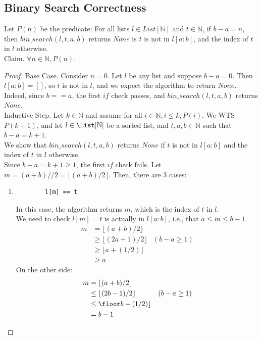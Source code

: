 \documentclass{article}
\begin{document}
\subsection{Binary Search Correctness}
Let $P(n)$ be the predicate: For all lists $l \in List[\mathbb{N}]$ and $t \in \mathbb{N}$, if $b - a = n$, then $bin\_search(l,t,a,b)$ returns $None$ is $t$ is not in $l[a:b]$, and the index of $t$ in $l$ otherwise.\\
Claim. $\forall n \in \mathbb{N}, P(n)$.
\begin{proof}
Base Case. Consider $n = 0$. Let $l$ be any list and suppose $b-a = 0$. Then $l[a:b] = []$, so $t$ is not in $l$, and we expect the algorithm to return $None$.\\
Indeed, since $b == a$, the first $if$ check passes, and $bin\_search(l,t,a,b)$ returns $None$.
\\
Inductive Step. Let $k \in \mathbb{N}$ and assume for all $i \in \mathbb{N}, i \leq k, P(i)$. We WTS $P(k+1)$, and let $l \in \List[\mathbb{N}]$ be a sorted list, and $t,a,b \in \mathbb{N}$ such that $b - a = k+1$.\\
We show that $bin\_search(l,t,a,b)$ returns $None$ if $t$ is not in $l[a:b]$ and the index of $t$ in $l$ otherwise.\\
Since $b - a = k + 1 \geq 1$, the first $if$ check fails. Let $m = (a+b) //2 = \lfloor(a+b)/2\rfloor$. Then, there are 3 cases:
\begin{enumerate}
    \item \begin{verbatim}
        l[m] == t
    \end{verbatim}
    In this case, the algorithm returns $m$, which is the index of $t$ in $l$.\\
    We need to check $l[m] = t$ is actually in $l[a:b]$, i.e., that $a \leq m \leq b -1$.
    \begin{align*}
        m & = \lfloor(a+b)/2\rfloor\\
        & \geq \lfloor(2a+1)/2\rfloor & (b-a \geq 1)\\
        & \geq \lfloor a + (1/2)\rfloor\\
        & \geq a
    \end{align*}
    On the other side:
    \begin{align*}
        m & = \lfloor (a+b)/2 \rfloor\\
        & \leq \lfloor (2b-1)/2 \rfloor & (b-a \geq 1)\\
        & \leq \floor b - (1/2)\rfloor\\
        & = b-1
    \end{align*}
    

\end{enumerate}
\end{proof}
\end{document}
